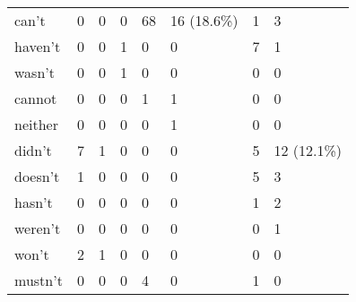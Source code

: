 \begin{screenonly}
\begin{table*}[h]
{\begin{tabular*}{\hsize}{@{\extracolsep{\fill}}llllllll}
      can't & 0 & 0 & 0 & 68 \hspace{1ex}{\small (27.9\%)} & 16 {\small (18.6\%)} & 1 \hspace{1ex}{\small (1.5\%)}& 3 \hspace{1ex}{\small (3\%)}\\
      haven't & 0 & 0 & 1 \hspace{2ex}{\small (0.3\%)} & 0 & 0 & 7 \hspace{1ex}{\small (10.6\%)} & 1 \hspace{1ex}{\small (1\%)}\\
      wasn't & 0 & 0 & 1 \hspace{2ex}{\small (0.3\%)} & 0 & 0 & 0 & 0\\
      cannot & 0 & 0 & 0 & 1 \hspace{2ex}{\small (0.4\%)} & 1 \hspace{1ex}{\small (1.2\%)} & 0 & 0\\
      neither & 0 & 0 & 0 & 0 & 1 \hspace{1ex}{\small (1.2\%)} & 0 & 0\\
      didn't & 7 \hspace{2ex}{\small (1.6\%)} & 1 \hspace{2ex}{\small (0.2\%)} & 0 & 0 & 0 & 5 \hspace{1ex}{\small (7.6\%)} & 12 {\small (12.1\%)}\\
      doesn't & 1 \hspace{2ex}{\small (0.2\%)} & 0 & 0 & 0 & 0 & 5 \hspace{1ex}{\small (7.6\%)} & 3 \hspace{1ex}{\small (3\%)}\\
      hasn't & 0 & 0 & 0 & 0 & 0 & 1 \hspace{1ex}{\small (1.5\%)}& 2 \hspace{1ex}{\small (2\%)}\\
      weren't & 0 & 0 & 0 & 0 & 0 & 0 & 1 \hspace{1ex}{\small (1\%)}\\
      won't & 2 \hspace{2ex}{\small (0.5\%)} & 1 \hspace{2ex}{\small (0.2\%)} & 0 & 0 & 0 & 0 & 0\\
      mustn't & 0 & 0 & 0 & 4 \hspace{2ex}{\small (1.6\%)} & 0 & 1 \hspace{1ex}{\small (1.5\%)} & 0\\
      \bottomrule
    \end{tabular*}
}
\end{table*}
\end{screenonly}
